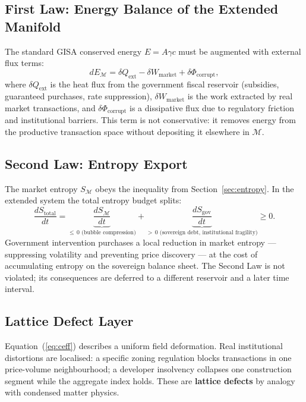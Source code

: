 \documentclass[12pt,a4paper]{article}
\begin{document}
\subsection{First Law: Energy Balance of the Extended Manifold}

The standard GISA conserved energy $E = A\gamma c$ must be augmented
with external flux terms:
\begin{equation}
    dE_{\mathcal{M}} = \delta Q_{\mathrm{ext}}
                     - \delta W_{\mathrm{market}}
                     + \delta\Phi_{\mathrm{corrupt}},
\end{equation}
where $\delta Q_{\mathrm{ext}}$ is the heat flux from the government
fiscal reservoir (subsidies, guaranteed purchases, rate suppression),
$\delta W_{\mathrm{market}}$ is the work extracted by real market
transactions, and $\delta\Phi_{\mathrm{corrupt}}$ is a dissipative
flux due to regulatory friction and institutional barriers. This term
is not conservative: it removes energy from the productive transaction
space without depositing it elsewhere in $\mathcal{M}$.

\subsection{Second Law: Entropy Export}

The market entropy $S_{\mathcal{M}}$ obeys the inequality from
Section~\ref{sec:entropy}. In the extended system the total entropy
budget splits:
\begin{equation}
    \frac{dS_{\mathrm{total}}}{dt}
    = \underbrace{\frac{dS_{\mathcal{M}}}{dt}}_{\leq\,0
      \text{ (bubble compression)}}
    + \underbrace{\frac{dS_{\mathrm{gov}}}{dt}}_{>\,0
      \text{ (sovereign debt, institutional fragility)}}
    \geq 0.
\end{equation}
Government intervention purchases a local reduction in market entropy
--- suppressing volatility and preventing price discovery --- at the
cost of accumulating entropy on the sovereign balance sheet.
The Second Law is not violated; its consequences are deferred to a
different reservoir and a later time interval.

\subsection{Lattice Defect Layer}

Equation~(\ref{eq:ceff}) describes a uniform field deformation. Real
institutional distortions are localised: a specific zoning regulation
blocks transactions in one price-volume neighbourhood; a developer
insolvency collapses one construction segment while the aggregate index
holds. These are \textbf{lattice defects} by analogy with condensed
matter physics.
\end{document}
